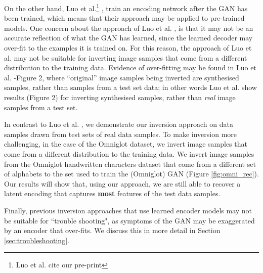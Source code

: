 \documentclass[journal]{IEEEtran}
\begin{document}
On the other hand, Luo et al.\footnote{Luo et al. cite our pre-print} \cite{luo2017learning}, train an encoding network after the GAN has been trained, which means that their approach may be applied to pre-trained models. One concern about the approach of Luo et al. \cite{luo2017learning}, is that it may not be an accurate reflection of what the GAN has learned, since the learned decoder may over-fit to the examples it is trained on. For this reason, the approach of Luo et al. \cite{luo2017learning} may not be suitable for inverting image samples that come from a different distribution to the training data. Evidence of over-fitting may be found in Luo et al. \cite{luo2017learning}-Figure 2, where ``original'' image samples being inverted are synthesised samples, rather than samples from a test set data; in other words Luo et al. \cite{luo2017learning} show results (Figure 2) for inverting synthesised samples, rather than \textit{real} image samples from a test set. 

In contrast to Luo et al. \cite{luo2017learning}, we demonstrate our inversion approach on data samples drawn from test sets of real data samples. To make inversion more challenging, in the case of the Omniglot dataset, we invert image samples that come from a different distribution to the training data. We invert image samples from the Omniglot handwritten characters dataset that come from a different set of alphabets to the set used to train the (Omniglot) GAN  (Figure \ref{fig:omni_rec}). Our results will show that, using our approach, we are still able to recover a latent encoding that captures \textbf{most} features of the test data samples.


Finally, previous inversion approaches that use learned encoder models \cite{li2017alice, donahue2016adversarial, dumoulin2016adversarially, luo2017learning} may not be suitable for ``trouble shooting", as symptoms of the GAN may be exaggerated by an encoder that over-fits. We discuss this in more detail in Section \ref{sec:troubleshooting}.

\end{document}
